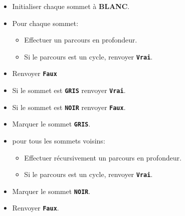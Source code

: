 \documentclass[svgnames,11pt]{beamer}
\begin{document}
\begin{frame}
    \frametitle{}
    \begin{center}
        \begin{framed}
            \begin{itemize}
                \item Initialiser chaque sommet à \textbf{BLANC}.
                \item Pour chaque sommet:
                      \begin{itemize}
                          \item Effectuer un parcours en profondeur.
                          \item Si le parcours est un cycle, renvoyer \textbf{\texttt{Vrai}}.
                      \end{itemize}
                \item Renvoyer \textbf{\texttt{Faux}}
            \end{itemize}
        \end{framed}
        
    \begin{framed}
        \begin{itemize}
            \item Si le sommet est \textbf{\texttt{GRIS}} renvoyer \textbf{\texttt{Vrai}}.
            \item Si le sommet est \textbf{\texttt{NOIR}} renvoyer \textbf{\texttt{Faux}}.
            \item Marquer le sommet \textbf{\texttt{GRIS}}.
            \item pour tous les sommets voisins:
            \begin{itemize}
                \item Effectuer récursivement un parcours en profondeur.
                \item Si le parcours est un cycle, renvoyer \textbf{\texttt{Vrai}}.
            \end{itemize}
            \item Marquer le sommet \textbf{\texttt{NOIR}}.
            \item Renvoyer \textbf{\texttt{Faux}}.
        \end{itemize}
    \end{framed}
\end{center}

\end{frame}
\end{document}
